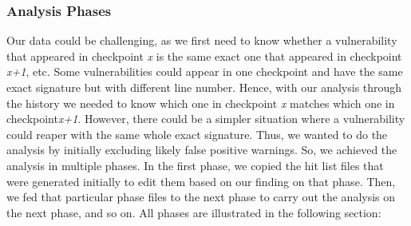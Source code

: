 \subsubsection{\textbf{Analysis Phases}}
Our data could be challenging, as we first need to know whether a vulnerability that appeared in checkpoint \textit{x} is the same exact one that appeared in checkpoint \textit{x+1}, etc. Some vulnerabilities could appear in one checkpoint and have the same exact signature but with different line number. Hence, with our analysis through the history we needed to know which one in checkpoint \textit{x} matches which one in checkpoint\textit{x+1}.
However, there could be a simpler situation where a vulnerability could reaper with the same whole exact signature. Thus, we wanted to do the analysis by initially excluding likely false positive warnings. So, we achieved the analysis in multiple phases. In the first phase,  we copied the hit list files that were generated initially to  edit them based on our finding on that phase. Then, we fed that particular phase files to the next phase to carry out 
the analysis on the next phase, and so on. All phases are illustrated in the following section:
